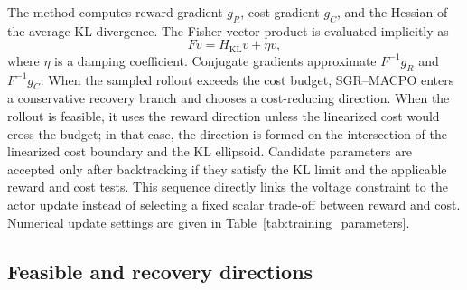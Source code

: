 \documentclass[final,5p,times]{elsarticle}
\newcommand{\method}{SGR--MACPO\xspace}
\begin{document}
The method computes reward gradient $g_R$, cost gradient $g_C$, and the Hessian of the average KL divergence. The Fisher-vector product is evaluated implicitly as
\begin{equation}
  \label{eq:fisher_vector_product}
  Fv = H_{\mathrm{KL}}v+\eta v,
\end{equation}
where $\eta$ is a damping coefficient. Conjugate gradients approximate $F^{-1}g_R$ and $F^{-1}g_C$. When the sampled rollout exceeds the cost budget, \method enters a conservative recovery branch and chooses a cost-reducing direction. When the rollout is feasible, it uses the reward direction unless the linearized cost would cross the budget; in that case, the direction is formed on the intersection of the linearized cost boundary and the KL ellipsoid. Candidate parameters are accepted only after backtracking if they satisfy the KL limit and the applicable reward and cost tests. This sequence directly links the voltage constraint to the actor update instead of selecting a fixed scalar trade-off between reward and cost. Numerical update settings are given in Table~\ref{tab:training_parameters}.

\subsection{Feasible and recovery directions}
\label{sec:update_directions}
\end{document}
